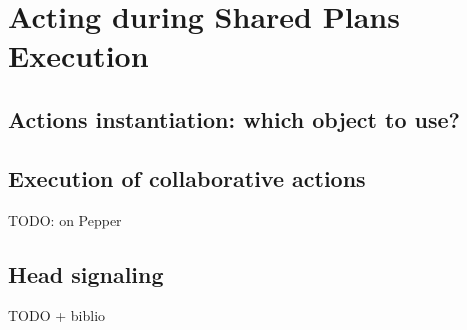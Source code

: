 \documentclass[english,a4paper,11pt,twoside]{StyleThese}
\begin{document}
\setcounter{chapter}{4} %
\dominitoc
\faketableofcontents
\fi

\chapter{Acting during Shared Plans Execution}
\minitoc

\section{Actions instantiation: which object to use?}

\section{Execution of collaborative actions}

TODO: on Pepper

\section{Head signaling}

TODO + biblio


\ifdefined{}
\else


\end{document}
